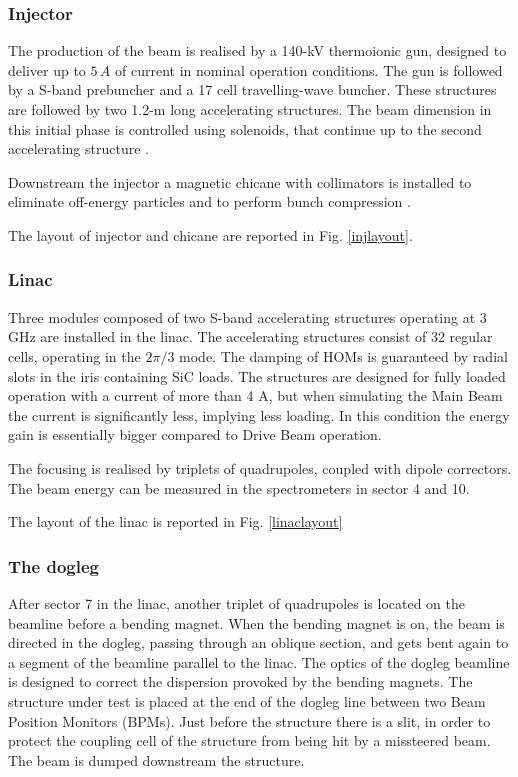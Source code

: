 \subsubsection{Injector}

The production of the beam is realised by a 140-kV thermoionic gun, designed to deliver up to $5\,A$ of current in nominal operation conditions.
The gun is followed by a S-band prebuncher and a 17 cell travelling-wave buncher. These structures are followed by two 1.2-m long accelerating structures. The beam dimension in this initial phase is controlled using solenoids, that continue up to the second accelerating structure \cite{ctf:injector}.

Downstream the injector a magnetic chicane with collimators is installed to eliminate off-energy particles and to perform bunch compression  \cite{Braun:999488}.

The layout of injector and chicane are reported in Fig. \ref{injlayout}.

\subsubsection{Linac}

Three modules composed of two S-band accelerating structures operating at 3 GHz are installed in the linac. The accelerating structures consist of 32 regular cells, operating in the $2\pi/3$ mode. The damping of HOMs is guaranteed by radial slots in the iris containing SiC loads. The structures are designed for fully loaded operation with a current of more than 4 A, but when simulating the Main Beam the current is significantly less, implying less loading. In this condition the energy gain is essentially bigger compared to Drive Beam operation.

The focusing is realised by triplets of quadrupoles, coupled with dipole correctors. The beam energy can be measured in the spectrometers in sector 4 and 10.

The layout of the linac is reported in Fig. \ref{linaclayout}

\subsubsection{The dogleg}

After sector 7 in the linac, another triplet of quadrupoles is located on the beamline before a bending magnet. When the bending magnet is on, the beam is directed in the dogleg, passing through an oblique section, and gets bent again to a segment of the beamline parallel to the linac. The optics of the dogleg beamline is designed to correct the dispersion provoked by the bending magnets. The structure under test is placed at the end of the dogleg line between two Beam Position Monitors (BPMs). Just before the structure there is a slit, in order to protect the coupling cell of the structure from being hit by a missteered beam. The beam is dumped downstream the structure.

